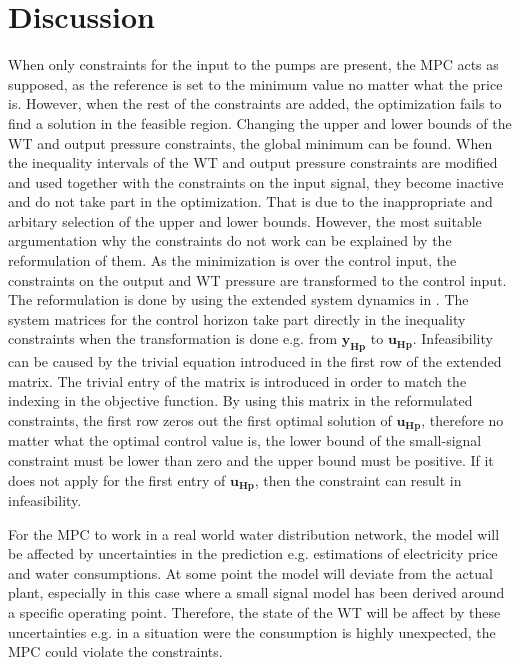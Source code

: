 \chapter{Discussion}
\label{Discussion}

When only constraints for the input to the pumps are present, the MPC acts as supposed, as the reference is set to the minimum value no matter what the price is. However, when the rest of the constraints are added, the optimization fails to find a solution in the feasible region. Changing the upper and lower bounds of the WT and output pressure constraints, the global minimum can be found. When the inequality intervals of the WT and output pressure constraints are modified and used together with the constraints on the input signal, they become inactive and do not take part in the optimization. That is due to the inappropriate and arbitary selection of the upper and lower bounds. 
However, the most suitable argumentation why the constraints do not work can be explained by the reformulation of them. As the minimization is over the control input, the constraints on the output and WT pressure are transformed to the control input. The reformulation is done by using the extended system dynamics in . The system matrices for the control horizon take part directly in the inequality constraints when the transformation is done e.g. from $\bm{y_{Hp}}$ to $\bm{u_{Hp}}$. Infeasibility can be caused by the trivial equation introduced in the first row of the extended matrix. The trivial entry of the matrix is introduced in order to match the indexing in the objective function. By using this matrix in the reformulated constraints, the first row zeros out the first optimal solution of $\bm{u_{Hp}}$, therefore no matter what the optimal control value is, the lower bound of the small-signal constraint must be lower than zero and the upper bound must be positive. If it does not apply for the first entry of $\bm{u_{Hp}}$, then the constraint can result in infeasibility. 

For the MPC to work in a real world water distribution network, the model will be affected by uncertainties in the prediction e.g. estimations of electricity price and water consumptions. At some point the model will deviate from the actual plant, especially in this case where a small signal model has been derived around a specific operating point. Therefore, the state of the WT will be affect by these uncertainties e.g. in a situation were the consumption is highly unexpected, the MPC could violate the constraints.

